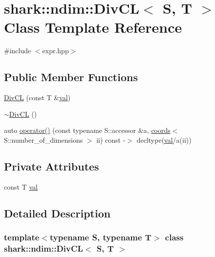 \hypertarget{classshark_1_1ndim_1_1_div_c_l}{}\section{shark\+:\+:ndim\+:\+:Div\+CL$<$ S, T $>$ Class Template Reference}
\label{classshark_1_1ndim_1_1_div_c_l}


{\ttfamily \#include $<$expr.\+hpp$>$}

\subsection*{Public Member Functions}
\begin{DoxyCompactItemize}
\item 
\hyperlink{classshark_1_1ndim_1_1_div_c_l_a50e01571a43ce833ad33e3d204cda6fc}{Div\+CL} (const T \&\hyperlink{classshark_1_1ndim_1_1_div_c_l_af54241a85b56dd2e61b4e849b1ad1dd7}{val})
\item 
\hyperlink{classshark_1_1ndim_1_1_div_c_l_ac4a6d4fe77e2be99aa0f5e3596425921}{$\sim$\+Div\+CL} ()
\item 
auto \hyperlink{classshark_1_1ndim_1_1_div_c_l_aa5c616ce4fd058bf3a304b0686c8cd12}{operator()} (const typename S\+::accessor \&a, \hyperlink{structshark_1_1ndim_1_1coords}{coords}$<$ S\+::number\+\_\+of\+\_\+dimensions $>$ ii) const -\/$>$ decltype(\hyperlink{classshark_1_1ndim_1_1_div_c_l_af54241a85b56dd2e61b4e849b1ad1dd7}{val}/a(ii))
\end{DoxyCompactItemize}
\subsection*{Private Attributes}
\begin{DoxyCompactItemize}
\item 
const T \hyperlink{classshark_1_1ndim_1_1_div_c_l_af54241a85b56dd2e61b4e849b1ad1dd7}{val}
\end{DoxyCompactItemize}


\subsection{Detailed Description}
\subsubsection*{template$<$typename S, typename T$>$\newline
class shark\+::ndim\+::\+Div\+C\+L$<$ S, T $>$}

